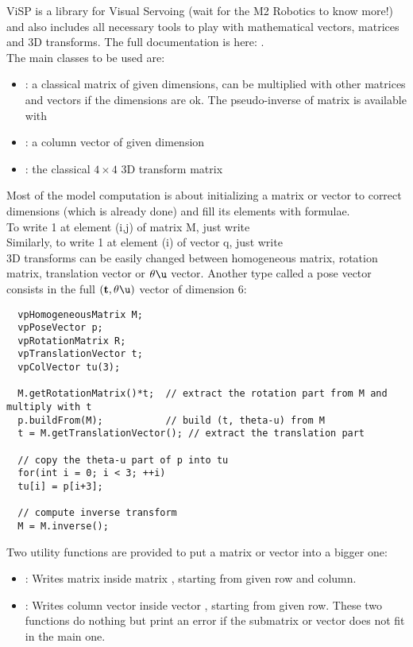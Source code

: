 \documentclass{ecnreport}
\begin{document}
  ViSP is a library for Visual Servoing (wait for the M2 Robotics to know more!) and also includes all necessary tools to play with mathematical vectors, matrices and 3D transforms.
  The full documentation is here: .\\
  The main classes to be used are:
  \begin{itemize}
    \item {}: a classical matrix of given dimensions, can be multiplied with other matrices and vectors if the dimensions are ok. The pseudo-inverse of matrix  
    is available with 
    \item {}: a column vector of given dimension
    \item {}: the classical $4\times 4$ 3D transform matrix
  \end{itemize}
  Most of the model computation is about initializing a matrix or vector to correct dimensions (which is already done) and fill its elements with formulae.\\
  To write 1 at element (i,j) of matrix M, just write \\
  Similarly, to write 1 at element (i) of vector q, just write \\
  
  3D transforms can be easily changed between homogeneous matrix, rotation matrix, translation vector or $\theta\u$ vector. Another type called a pose vector
  consists in the full $(\mathbf{t}, \theta\u)$ vector of dimension 6:
  \cppstyle
  \begin{lstlisting}
  vpHomogeneousMatrix M;
  vpPoseVector p;
  vpRotationMatrix R;
  vpTranslationVector t;
  vpColVector tu(3);
  
  M.getRotationMatrix()*t;	// extract the rotation part from M and multiply with t
  p.buildFrom(M);			// build (t, theta-u) from M
  t = M.getTranslationVector();	// extract the translation part
  
  // copy the theta-u part of p into tu
  for(int i = 0; i < 3; ++i)
  tu[i] = p[i+3];
  
  // compute inverse transform
  M = M.inverse();
  \end{lstlisting}
  
  Two utility functions are provided to put a matrix or vector into a bigger one:
  \begin{itemize}
    \item {}: Writes matrix  inside matrix , starting from given row and column.
    \item {}: Writes column vector  inside vector , starting from given row. These two functions do nothing but print an error
    if the submatrix or vector does not fit in the main one.
  \end{itemize}
  
\end{document}
